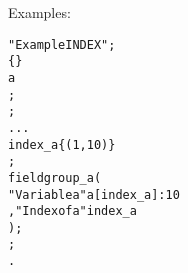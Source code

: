 \vspace{0.5cm}

Examples:

\begin{boxedminipage}[t]{\linewidth}
\begin{alltt}
\DESCRIPTION "Example INDEX";
\DATAPOOL
  \REAL \{\EDITABLE\}
    a
   ;
\END \DATAPOOL;
  ...
\UIMANAGER
  \INDEX
    index\_a \{ \RANGE(1,10) \}
  ;
  \FIELDGROUP
    fieldgroup\_a (
      "Variable a"  a[index\_a]:10
     ,"Index of a"  index\_a
    );
\END \UIMANAGER;
\END.
\end{alltt}
\end{boxedminipage}

